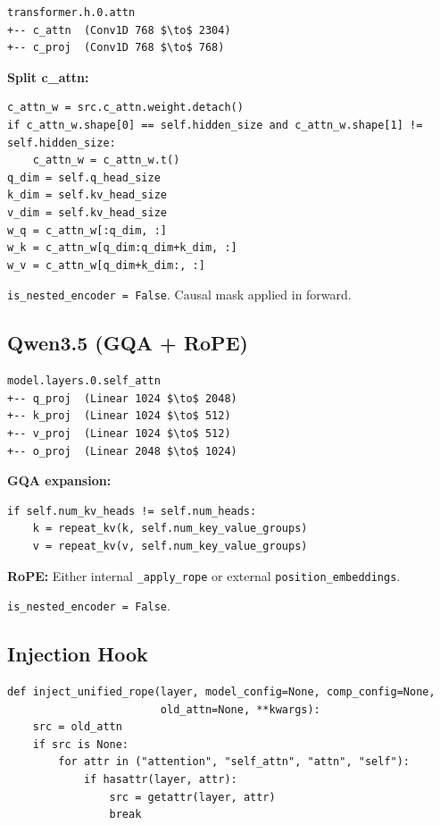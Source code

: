 {\begin{lstlisting}
transformer.h.0.attn
+-- c_attn  (Conv1D 768 $\to$ 2304)
+-- c_proj  (Conv1D 768 $\to$ 768)
\end{lstlisting}

\textbf{Split c\_attn:}
\begin{lstlisting}
c_attn_w = src.c_attn.weight.detach()
if c_attn_w.shape[0] == self.hidden_size and c_attn_w.shape[1] != self.hidden_size:
    c_attn_w = c_attn_w.t()
q_dim = self.q_head_size
k_dim = self.kv_head_size
v_dim = self.kv_head_size
w_q = c_attn_w[:q_dim, :]
w_k = c_attn_w[q_dim:q_dim+k_dim, :]
w_v = c_attn_w[q_dim+k_dim:, :]
\end{lstlisting}

\texttt{is\_nested\_encoder = False}. Causal mask applied in forward.

\subsection{Qwen3.5 (GQA + RoPE)}

\begin{lstlisting}
model.layers.0.self_attn
+-- q_proj  (Linear 1024 $\to$ 2048)
+-- k_proj  (Linear 1024 $\to$ 512)
+-- v_proj  (Linear 1024 $\to$ 512)
+-- o_proj  (Linear 2048 $\to$ 1024)
\end{lstlisting}

\textbf{GQA expansion:}
\begin{lstlisting}
if self.num_kv_heads != self.num_heads:
    k = repeat_kv(k, self.num_key_value_groups)
    v = repeat_kv(v, self.num_key_value_groups)
\end{lstlisting}

\textbf{RoPE:} Either internal \texttt{\_apply\_rope} or external \texttt{position\_embeddings}.

\texttt{is\_nested\_encoder = False}.

\subsection{Injection Hook}

\begin{lstlisting}
def inject_unified_rope(layer, model_config=None, comp_config=None,
                        old_attn=None, **kwargs):
    src = old_attn
    if src is None:
        for attr in ("attention", "self_attn", "attn", "self"):
            if hasattr(layer, attr):
                src = getattr(layer, attr)
                break
    

\end{lstlisting}}
